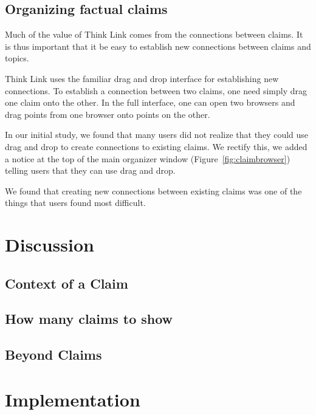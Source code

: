\documentclass{chi2009}
\newcommand{\todo}[1]{}
\begin{document}
\todo{Make new snippet icon throb when something is selected}



\subsection{Organizing factual claims}

Much of the value of Think Link comes from the connections between claims. It is thus important that it be easy to establish new connections between claims and topics. 

Think Link uses the familiar drag and drop interface for establishing new connections. To establish a connection between two claims, one need simply drag one claim onto the other. In the full interface, one can open two browsers and drag points from one browser onto points on the other.

In our initial study, we found that many users did not realize that they could use drag and drop to create connections to existing claims. We rectify this, we added a notice at the top of the main organizer window (Figure~\ref{fig:claimbrowser}) telling users that they can use drag and drop.

We found that creating new connections between existing claims was one of the things that users found most difficult.

\todo{say more here}

\section{Discussion}

\subsection{Context of a Claim}

\subsection{How many claims to show}

\subsection{Beyond Claims}

\section{Implementation}
\end{document}

